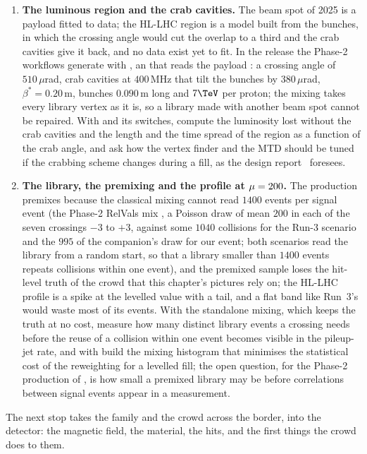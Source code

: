 \begin{enumerate}
    \cref{ch:the_police}. With the jet listings of the two records,
    characterise the survivors, their number of collisions, their widths
    and their charged fractions, and ask which variable separates a crowd
    jet from a soft quark jet at the generator level; the Phase-2 question
    is whether the L1 track trigger of \cite{CMS:2020jkc} can make that
    separation at $40\,\mathrm{MHz}$.
  \item \textbf{The luminous region and the crab cavities.} The beam
    spot of 2025 is a payload fitted to data; the HL-LHC region is a
    model built from the bunches, in which the crossing angle would cut the
overlap to a third and the crab cavities give it back, and no data exist yet
    to fit. In the release the Phase-2 workflows generate with
    , an 
    that reads the payload
    : a
    crossing angle of $510\,\mu$rad, crab cavities at $400$\,MHz that
    tilt the bunches by $380\,\mu$rad, $\beta^*=0.20$\,m, bunches
    $0.090$\,m long and $7\TeV$ per proton; the mixing takes every library
    vertex as it is, so a library made with another beam spot cannot be
    repaired. With  and its switches, compute
    the luminosity lost without the crab cavities and the length and the
    time spread of the region as a function of the crab angle, and ask how
    the vertex finder and the MTD should be tuned if the crabbing scheme
    changes during a fill, as the design report~\cite{Apollinari:2017lhl}
    foresees.
  \item \textbf{The library, the premixing and the profile at
    $\mu=200$.} The production premixes because the classical mixing
    cannot read $1400$ events per signal event (the Phase-2 RelVals mix
    , a Poisson draw of mean $200$ in each of the
    seven crossings $-3$ to $+3$, against some $1040$ collisions for the
    Run-3 scenario and the $995$ of the companion's draw for our event; both
    scenarios read the library from a random start, so that a library
    smaller than $1400$ events repeats collisions within one event), and the premixed sample
    loses the hit-level truth of the crowd that this chapter's pictures
    rely on; the HL-LHC profile is a spike at the levelled value with a
    tail, and a flat band like Run~3's would waste most of its events.
    With the standalone mixing, which keeps the truth at no cost, measure
    how many distinct library events a crossing needs before the reuse of
    a collision within one event becomes visible in the pileup-jet rate,
    and with  build the mixing histogram that
    minimises the statistical cost of the reweighting for a levelled
    fill; the open question, for the Phase-2 production of
    \cite{Hildreth:2017caz}, is how small a premixed library may be
    before correlations between signal events appear in a measurement.
\end{enumerate}
The next stop takes the family and the crowd across the border, into the
detector: the magnetic field, the material, the hits, and the first
things the crowd does to them.
